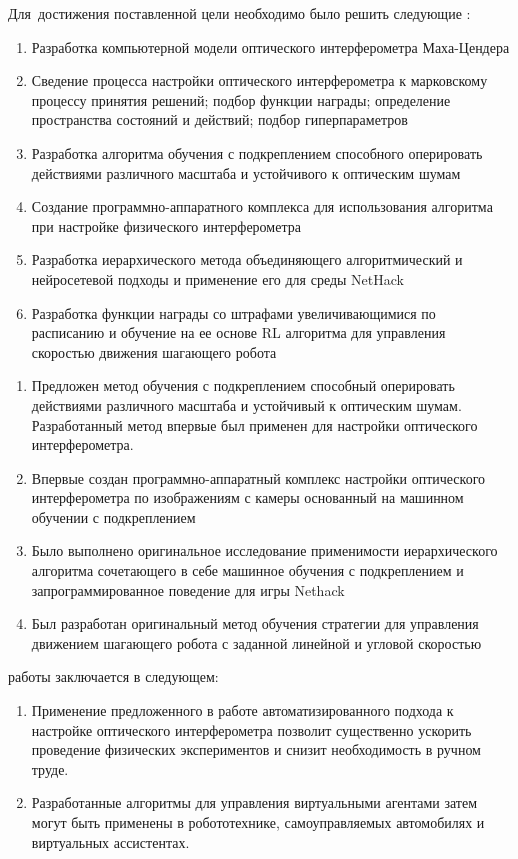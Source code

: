Для~достижения поставленной цели необходимо было решить следующие {\tasks}:
\begin{enumerate}[beginpenalty=10000] %
  \item Разработка компьютерной модели оптического интерферометра Маха-Цендера
  \item Сведение процесса настройки оптического интерферометра к марковскому процессу принятия решений; подбор функции награды; определение пространства состояний и действий; подбор гиперпараметров
  \item Разработка алгоритма обучения с подкреплением способного оперировать действиями различного масштаба и устойчивого к оптическим шумам
  \item Создание программно-аппаратного комплекса для использования алгоритма при настройке физического интерферометра
  \item Разработка иерархического метода объединяющего алгоритмический и нейросетевой подходы и применение его для среды NetHack
  \item Разработка функции награды со штрафами увеличивающимися по расписанию и обучение на ее основе RL алгоритма для управления скоростью движения шагающего робота %
\end{enumerate}


{\novelty}
\begin{enumerate}[beginpenalty=10000] %
  \item Предложен метод обучения с подкреплением способный оперировать действиями различного масштаба и устойчивый к оптическим шумам. Разработанный метод впервые был применен для настройки оптического интерферометра. 
  \item Впервые создан программно-аппаратный комплекс настройки оптического интерферометра по изображениям с камеры основанный на машинном обучении с подкреплением
  \item Было выполнено оригинальное исследование применимости иерархического алгоритма сочетающего в себе машинное обучения с подкреплением и запрограммированное поведение для игры Nethack
  \item Был разработан оригинальный метод обучения стратегии для управления движением шагающего робота с заданной линейной и угловой скоростью
\end{enumerate}

{\influence} работы заключается в следующем:
\begin{enumerate}[beginpenalty=10000] %
  \item Применение предложенного в работе автоматизированного подхода к настройке оптического интерферометра позволит существенно ускорить проведение физических экспериментов и снизит необходимость в ручном труде. 
  \item Разработанные алгоритмы для управления виртуальными агентами затем могут быть применены в робототехнике, самоуправляемых автомобилях и виртуальных ассистентах. 
\end{enumerate}

